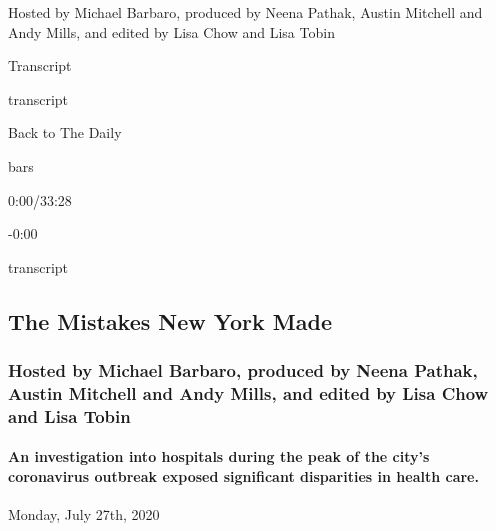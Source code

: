 Hosted by Michael Barbaro, produced by Neena Pathak, Austin Mitchell and
Andy Mills, and edited by Lisa Chow and Lisa Tobin

Transcript

transcript

Back to The Daily

bars

0:00/33:28

-0:00

transcript

\hypertarget{the-mistakes-new-york-made-2}{%
\subsection{The Mistakes New York
Made}\label{the-mistakes-new-york-made-2}}

\hypertarget{hosted-by-michael-barbaro-produced-by-neena-pathak-austin-mitchell-and-andy-mills-and-edited-by-lisa-chow-and-lisa-tobin-1}{%
\subsubsection{Hosted by Michael Barbaro, produced by Neena Pathak,
Austin Mitchell and Andy Mills, and edited by Lisa Chow and Lisa
Tobin}\label{hosted-by-michael-barbaro-produced-by-neena-pathak-austin-mitchell-and-andy-mills-and-edited-by-lisa-chow-and-lisa-tobin-1}}

\hypertarget{an-investigation-into-hospitals-during-the-peak-of-the-citys-coronavirus-outbreak-exposed-significant-disparities-in-health-care-2}{%
\paragraph{An investigation into hospitals during the peak of the city's
coronavirus outbreak exposed significant disparities in health
care.}\label{an-investigation-into-hospitals-during-the-peak-of-the-citys-coronavirus-outbreak-exposed-significant-disparities-in-health-care-2}}

Monday, July 27th, 2020


